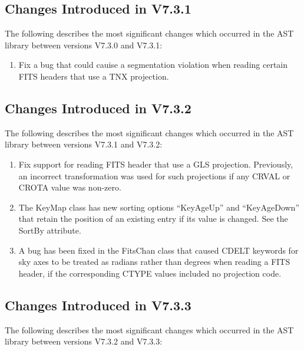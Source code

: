 \documentclass[twoside,11pt]{starlink}
\begin{document}
\subsection{Changes Introduced in V7.3.1}

The following describes the most significant changes which
occurred in the AST library between versions V7.3.0 and V7.3.1:

\begin{enumerate}

\item Fix a bug that could cauise a segmentation violation when reading
certain FITS headers that use a TNX projection.

\end{enumerate}

\subsection{Changes Introduced in V7.3.2}

The following describes the most significant changes which
occurred in the AST library between versions V7.3.1 and V7.3.2:

\begin{enumerate}

\item Fix support for reading FITS header that use a GLS projection.
Previously, an incorrect transformation was used for such projections if
any CRVAL or CROTA value was non-zero.

\item The KeyMap class has new sorting options ``KeyAgeUp'' and
``KeyAgeDown'' that retain the position of an existing entry if its value
is changed. See the SortBy attribute.

\item A bug has been fixed in the FitsChan class that caused CDELT keywords
for sky axes to be treated as radians rather than degrees when reading a
FITS header, if the corresponding CTYPE values included no projection code.

\end{enumerate}

\subsection{Changes Introduced in V7.3.3}

The following describes the most significant changes which
occurred in the AST library between versions V7.3.2 and V7.3.3:
\end{document}
